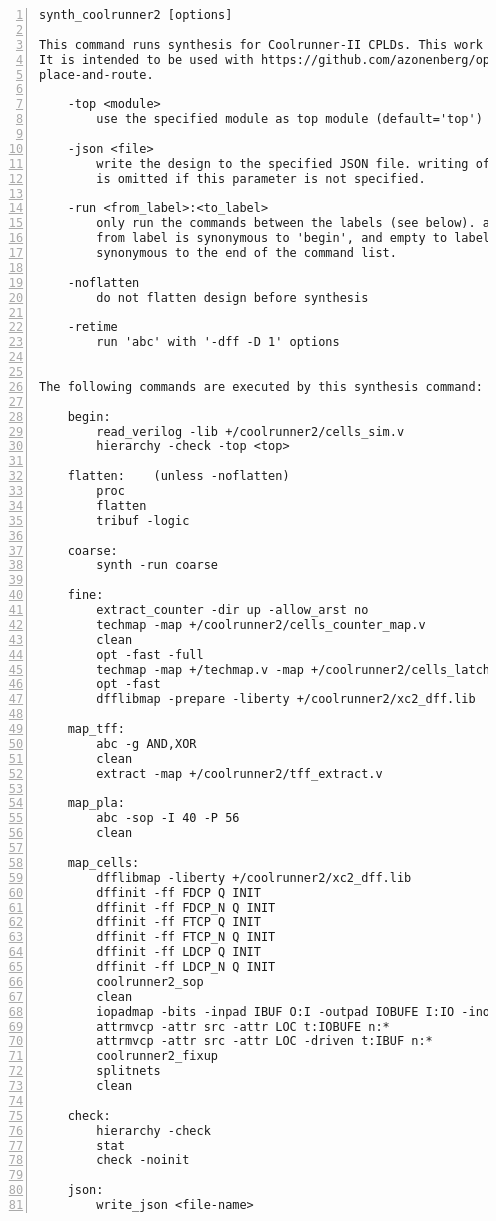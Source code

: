 \begin{lstlisting}[numbers=left,frame=single]
    synth_coolrunner2 [options]

This command runs synthesis for Coolrunner-II CPLDs. This work is experimental.
It is intended to be used with https://github.com/azonenberg/openfpga as the
place-and-route.

    -top <module>
        use the specified module as top module (default='top')

    -json <file>
        write the design to the specified JSON file. writing of an output file
        is omitted if this parameter is not specified.

    -run <from_label>:<to_label>
        only run the commands between the labels (see below). an empty
        from label is synonymous to 'begin', and empty to label is
        synonymous to the end of the command list.

    -noflatten
        do not flatten design before synthesis

    -retime
        run 'abc' with '-dff -D 1' options


The following commands are executed by this synthesis command:

    begin:
        read_verilog -lib +/coolrunner2/cells_sim.v
        hierarchy -check -top <top>

    flatten:    (unless -noflatten)
        proc
        flatten
        tribuf -logic

    coarse:
        synth -run coarse

    fine:
        extract_counter -dir up -allow_arst no
        techmap -map +/coolrunner2/cells_counter_map.v
        clean
        opt -fast -full
        techmap -map +/techmap.v -map +/coolrunner2/cells_latch.v
        opt -fast
        dfflibmap -prepare -liberty +/coolrunner2/xc2_dff.lib

    map_tff:
        abc -g AND,XOR
        clean
        extract -map +/coolrunner2/tff_extract.v

    map_pla:
        abc -sop -I 40 -P 56
        clean

    map_cells:
        dfflibmap -liberty +/coolrunner2/xc2_dff.lib
        dffinit -ff FDCP Q INIT
        dffinit -ff FDCP_N Q INIT
        dffinit -ff FTCP Q INIT
        dffinit -ff FTCP_N Q INIT
        dffinit -ff LDCP Q INIT
        dffinit -ff LDCP_N Q INIT
        coolrunner2_sop
        clean
        iopadmap -bits -inpad IBUF O:I -outpad IOBUFE I:IO -inoutpad IOBUFE O:IO -toutpad IOBUFE E:I:IO -tinoutpad IOBUFE E:O:I:IO
        attrmvcp -attr src -attr LOC t:IOBUFE n:*
        attrmvcp -attr src -attr LOC -driven t:IBUF n:*
        coolrunner2_fixup
        splitnets
        clean

    check:
        hierarchy -check
        stat
        check -noinit

    json:
        write_json <file-name>
\end{lstlisting}

